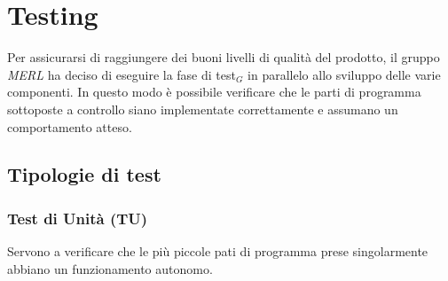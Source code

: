 \chapter{Testing}
Per assicurarsi di raggiungere dei buoni livelli di qualità del prodotto, il gruppo \textit{MERL} ha deciso di eseguire la fase di test$_G$ in parallelo allo sviluppo delle varie componenti. In questo modo è possibile verificare che le parti di programma sottoposte a controllo siano implementate correttamente e assumano un comportamento atteso.
\section{Tipologie di test}
    \subsection{Test di Unità (TU)}  Servono a verificare che le più piccole pati di programma prese singolarmente abbiano un funzionamento autonomo.
